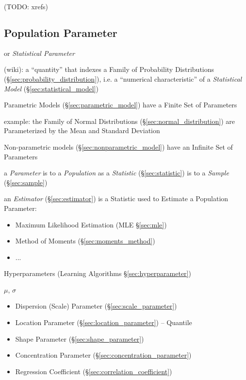 (TODO: xrefs)



\subsection{Population Parameter}\label{sec:population_parameter}

or \emph{Statistical Parameter}

(wiki): a ``quantity'' that indexes a Family of Probability Distributions
(\S\ref{sec:probability_distribution}), i.e. a ``numerical characteristic'' of a
\emph{Statistical Model} (\S\ref{sec:statistical_model})

Parametric Models (\S\ref{sec:parametric_model}) have a Finite Set of Parameters

example: the Family of Normal Distributions (\S\ref{sec:normal_distribution})
are Parameterized by the Mean and Standard Deviation

Non-parametric models (\S\ref{sec:nonparametric_model}) have an Infinite Set of
Parameters

a \emph{Parameter} is to a \emph{Population} as a \emph{Statistic}
(\S\ref{sec:statistic}) is to a \emph{Sample} (\S\ref{sec:sample})

\fist an \emph{Estimator} (\S\ref{sec:estimator}) is a Statistic used to
Estimate a Population Parameter:
\begin{itemize}
  \item Maximum Likelihood Estimation (MLE \S\ref{sec:mle})
  \item Method of Moments (\S\ref{sec:moments_method})
  \item ...
\end{itemize}

\fist Hyperparameters (Learning Algorithms \S\ref{sec:hyperparameter})

$\mu$, $\sigma$

\begin{itemize}
  \item Dispersion (Scale) Parameter (\S\ref{sec:scale_parameter})
  \item Location Parameter (\S\ref{sec:location_parameter}) -- Quantile
  \item Shape Parameter (\S\ref{sec:shape_parameter})
  \item Concentration Parameter (\S\ref{sec:concentration_parameter})
  \item Regression Coefficient (\S\ref{sec:correlation_coefficient})
\end{itemize}



